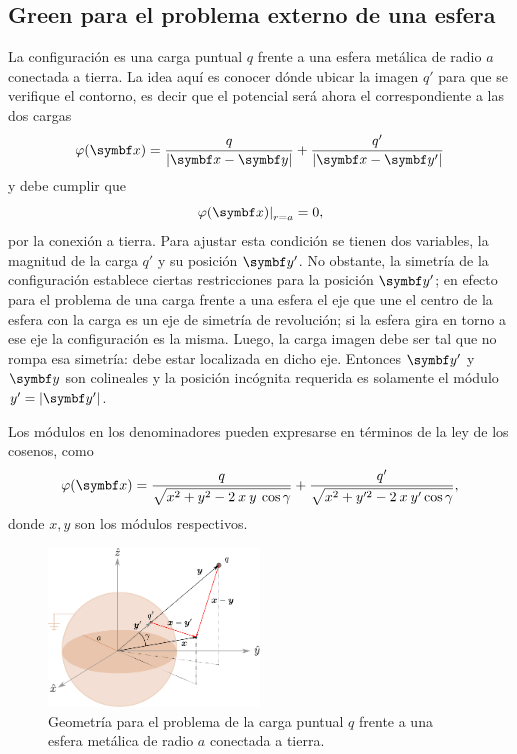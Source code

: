 \documentclass[10pt,oneside]{CBFT_book}
\begin{document}
\subsection{Green para el problema externo de una esfera}


La configuración es una carga puntual $q$ frente a una esfera metálica de radio $a$ conectada a tierra.
La idea aquí es conocer dónde ubicar la imagen $ q' $ para que se verifique el contorno, es decir que
el potencial será ahora el correspondiente a las dos cargas 
\[
	\vp(\vbx) = \frac{q}{|\vbx - \vb{y}|} + \frac{q'}{|\vbx - \vb{y}'|} 
\]
y debe cumplir que 
\[
	\left. \vp(\vbx)\right|_{r=a} = 0,
\]
por la conexión a tierra. Para ajustar esta condición se tienen dos variables, la magnitud de la carga
$q'$ y su posición $\vb{y}'$.
No obstante, la simetría de la configuración establece ciertas restricciones para la posición $\vb{y}'$;
en efecto para el problema de una carga frente a una esfera el eje que une el centro de la esfera con
la carga es un eje de simetría de revolución; si la esfera gira en torno a ese eje la configuración es
la misma. Luego, la carga imagen debe ser tal que no rompa esa simetría: debe estar localizada en dicho
eje. Entonces $\vb{y}'$ y $\vb{y}$ son colineales y la posición incógnita requerida es solamente el
módulo $y'= |\vb{y}'|$.

Los módulos en los denominadores pueden expresarse en términos de la ley de los cosenos, como
\[
	\vp(\vbx) = \frac{q}{\sqrt{ x^2 + y^2 - 2 \: x \: y \:\cos{\gamma}} } +
	\frac{q'}{\sqrt{ x^2 + y'^2 - 2 \: x \: y' \cos{\gamma} }},
\]
donde $x, y$ son los módulos respectivos.

\begin{figure}[!htb]
	\begin{center}
	\includegraphics[width=0.5\textwidth]{images/fig_ft1_esfera_imagenes.pdf}
	\end{center}
	\caption{Geometría para el problema de la carga puntual $q$ frente a una esfera
	metálica de radio $a$ conectada a tierra.}
\end{figure} 
\end{document}
